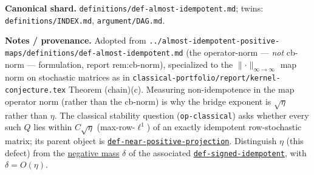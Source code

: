 \begin{defnote}
\par
\textbf{Canonical shard.} \texttt{definitions/\allowbreak{}def-\allowbreak{}almost-\allowbreak{}idempotent.\allowbreak{}md}; twins: \texttt{definitions/INDEX.md}, \texttt{argument/DAG.md}.
\par
\textbf{Notes / provenance.} Adopted from \texttt{..\allowbreak{}/\allowbreak{}almost-\allowbreak{}idempotent-\allowbreak{}positive-\allowbreak{}maps/\allowbreak{}definitions/\allowbreak{}def-\allowbreak{}almost-\allowbreak{}idempotent.\allowbreak{}md}
(the operator-norm --- \emph{not} cb-norm --- formulation, report rem:cb-norm), specialized to the
$\lVert\cdot\rVert_{\infty\to\infty}$ map norm on stochastic matrices as in
\texttt{classical-\allowbreak{}portfolio/\allowbreak{}report/\allowbreak{}kernel-\allowbreak{}conjecture.\allowbreak{}tex} Theorem (chain)(c). Measuring non-idempotence in the
map operator norm (rather than the cb-norm) is why the bridge exponent is $\sqrt\eta$ rather than $\eta$.
The classical stability question (\texttt{op-\allowbreak{}classical}) asks whether every such $Q$ lies within $C\sqrt\eta$
(max-row-$\ell^1$) of an exactly idempotent row-stochastic matrix; its parent object is
\hyperref[def:near-positive-projection]{\texttt{def-\allowbreak{}near-\allowbreak{}positive-\allowbreak{}projection}}. Distinguish $\eta$ (this defect) from the
\hyperref[def:negative-mass]{negative mass} $\delta$ of the associated \hyperref[def:signed-idempotent]{\texttt{def-\allowbreak{}signed-\allowbreak{}idempotent}}, with
$\delta=O(\eta)$.
\end{defnote}

